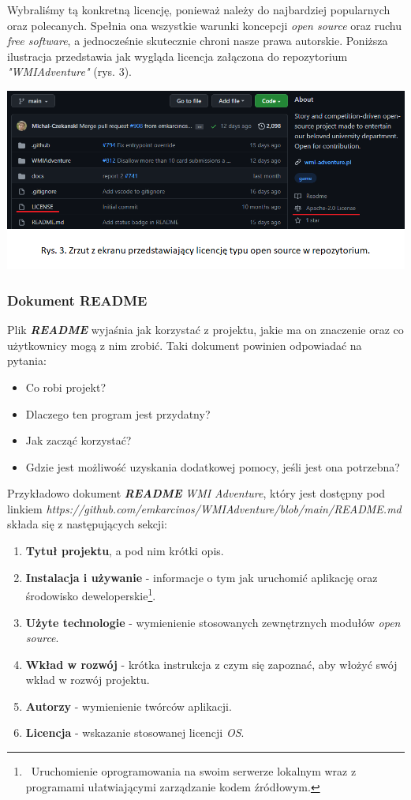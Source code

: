 \documentclass{article}
\begin{document}
Wybraliśmy tą konkretną licencję, ponieważ należy do najbardziej popularnych oraz polecanych. Spełnia ona wszystkie warunki koncepcji \emph{open source} oraz ruchu \emph{free software}, a jednocześnie skutecznie chroni nasze prawa autorskie. Poniższa ilustracja przedstawia jak wygląda licencja załączona do repozytorium \emph{"WMIAdventure"} (rys. 3).
\begin{center}
    \includegraphics[width = 1\textwidth]{licencja.png}
\end{center}

\subsubsection{Dokument README}

\hspace{4mm} Plik \textbf{\emph{README}} wyjaśnia jak korzystać z projektu, jakie ma on znaczenie oraz co użytkownicy mogą z nim zrobić. Taki dokument powinien odpowiadać na pytania\cite{opensource.guide}:
\begin{itemize}
    \item Co robi projekt?
    \item Dlaczego ten program jest przydatny?
    \item Jak zacząć korzystać?
    \item Gdzie jest możliwość uzyskania dodatkowej pomocy, jeśli jest ona potrzebna?
\end{itemize}

Przykładowo dokument \textbf{\emph{README}} \emph{WMI Adventure}, który jest dostępny pod linkiem \emph{https://github.com/emkarcinos/WMIAdventure/blob/main/README.md}\cite{wmi.readme} składa się z następujących sekcji:
\begin{enumerate}
    \item \textbf{Tytuł projektu}, a pod nim krótki opis.
    \item \textbf{Instalacja i używanie} - informacje o tym jak uruchomić aplikację oraz środowisko deweloperskie\footnote{\, Uruchomienie oprogramowania na swoim serwerze lokalnym wraz z programami ułatwiającymi zarządzanie kodem źródłowym.}.
    \item \textbf{Użyte technologie} - wymienienie stosowanych zewnętrznych modułów \emph{open source}.
    \item \textbf{Wkład w rozwój} - krótka instrukcja z czym się zapoznać, aby włożyć swój wkład w rozwój projektu.
    \item \textbf{Autorzy} - wymienienie twórców aplikacji.
    \item \textbf{Licencja} - wskazanie stosowanej licencji \emph{OS}.
\end{enumerate}
\end{document}
